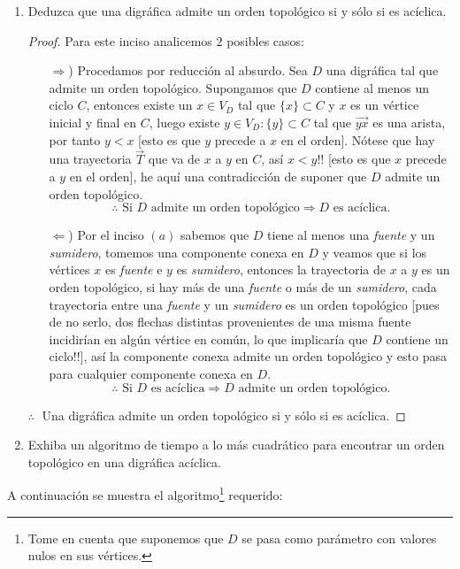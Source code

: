 \documentclass{article}
\begin{document}
\begin{enumerate}
\begin{enumerate}
\begin{proof}
      \hspace*{2cm} $\therefore\;$ Si $D$ es ac\'iclica tiene al menos una fuente y un sumidero.
    \end{proof}
  \item Deduzca que una digr\'afica admite un orden topol\'ogico si y s\'olo
    si es ac\'iclica.
    \begin{proof}
      Para este inciso analicemos $2$ posibles casos:
      \begin{itemize}
      \item[$\Rightarrow$)] Procedamos por reducci\'on al absurdo. Sea $D$ una
        digr\'afica tal que admite un orden topol\'ogico. Supongamos que $D$
        contiene al menos un ciclo $C$, entonces existe un $x \in V_D$ tal que
        $\{x\} \subset C$ y $x$ es un v\'ertice inicial y final en $C$, luego
        existe $y \in V_D : \{y\} \subset C$ tal que $\vec{yx}$ es una arista,
        por tanto $y < x$ [esto es que $y$ precede a $x$ en el orden]. N\'otese
        que hay una trayectoria $\vec{T}$ que va de $x$ a $y$ en $C$, as\'i
        $x < y$!! [esto es que $x$ precede a $y$ en el orden], he aqu\'i una
        contradicci\'on de suponer que $D$ admite un orden topol\'ogico.
        \[
        \therefore \text{ Si $D$ admite un orden topol\'ogico}
        \Rightarrow D \text{ es ac\'iclica.}
        \]
      \item[$\Leftarrow$)] Por el inciso $(a)$ sabemos que $D$ tiene al menos
        una \textit{fuente} y un \textit{sumidero}, tomemos una componente
        conexa en $D$ y veamos que si los v\'ertices $x$ es \textit{fuente}
        e $y$ es \textit{sumidero}, entonces la trayectoria de $x$ a $y$ es
        un orden topol\'ogico, si hay m\'as de una \textit{fuente} o m\'as de
        un \textit{sumidero}, cada trayectoria entre una \textit{fuente} y un
        \textit{sumidero} es un orden topol\'ogico [pues de no serlo, dos flechas
          distintas provenientes de una misma fuente incidir\'ian en alg\'un
          v\'ertice en com\'un, lo que implicar\'ia que $D$ contiene un ciclo!!],
        as\'i la componente conexa admite un orden topol\'ogico y esto pasa
        para cualquier componente conexa en $D$.
        \[
        \therefore \text{ Si $D$ es ac\'iclica}
        \Rightarrow D \text{ admite un orden topol\'ogico.}
        \]
      \end{itemize}
      \hspace*{1.3cm} $\therefore\;$ Una digr\'afica admite un orden
      topol\'ogico si y s\'olo si es ac\'iclica.
    \end{proof}
  \item Exhiba un algoritmo de tiempo a lo m\'as cuadr\'atico para encontrar
    un orden topol\'ogico en una digr\'afica ac\'iclica.
  \end{enumerate}
\end{enumerate}
A continuaci\'on se muestra el algoritmo\footnote{Tome en cuenta que suponemos
  que $D$ se pasa como par\'ametro con valores nulos en sus v\'ertices.} requerido:
\end{document}
